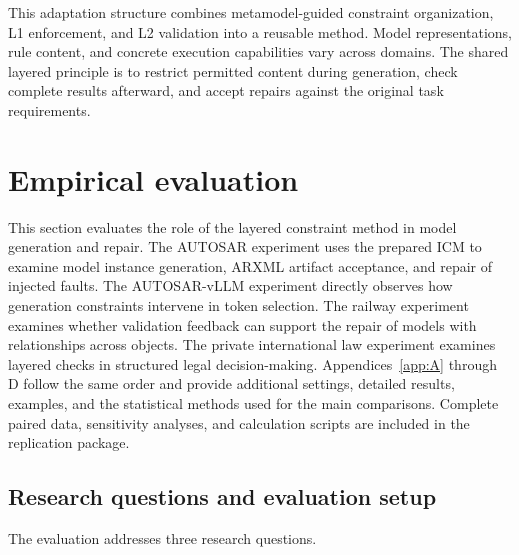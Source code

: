 \documentclass[pdflatex,iicol,sn-mathphys-num]{sn-jnl}
\begin{document}
This adaptation structure combines metamodel-guided constraint organization, L1 enforcement, and L2 validation into a reusable method. Model representations, rule content, and concrete execution capabilities vary across domains. The shared layered principle is to restrict permitted content during generation, check complete results afterward, and accept repairs against the original task requirements.




\section{Empirical evaluation}\label{sec:evaluation}

This section evaluates the role of the layered constraint method in model generation and repair. The AUTOSAR experiment uses the prepared ICM to examine model instance generation, ARXML artifact acceptance, and repair of injected faults. The AUTOSAR-vLLM experiment directly observes how generation constraints intervene in token selection. The railway experiment examines whether validation feedback can support the repair of models with relationships across objects. The private international law experiment examines layered checks in structured legal decision-making. Appendices~\ref{app:A} through D follow the same order and provide additional settings, detailed results, examples, and the statistical methods used for the main comparisons. Complete paired data, sensitivity analyses, and calculation scripts are included in the replication package.


\subsection{Research questions and evaluation setup}\label{sec:eval-4-1}

The evaluation addresses three research questions.
\end{document}
